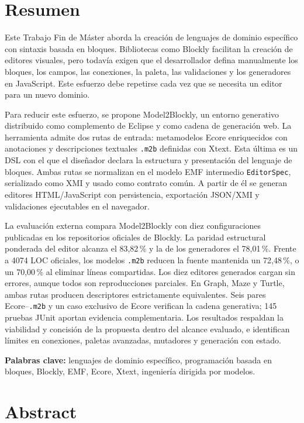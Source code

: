 \chapter*{Resumen}

Este Trabajo Fin de Máster aborda la creación de lenguajes de dominio
específico con sintaxis basada en bloques. Bibliotecas como Blockly facilitan la
creación de editores visuales, pero todavía exigen que el desarrollador defina
manualmente los bloques, los campos, las conexiones, la paleta, las
validaciones y los generadores en JavaScript. Este esfuerzo debe repetirse cada
vez que se necesita un editor para un nuevo dominio.

Para reducir este esfuerzo, se propone Model2Blockly, un entorno generativo
distribuido como complemento de Eclipse y como cadena de generación web. La
herramienta admite dos rutas de entrada: metamodelos Ecore enriquecidos con
anotaciones y descripciones textuales \texttt{.m2b} definidas con Xtext. Esta
última es un DSL con el que el diseñador declara la estructura y presentación
del lenguaje de bloques. Ambas rutas se normalizan en el modelo EMF intermedio
\texttt{EditorSpec}, serializado como XMI y usado como contrato común. A partir
de él se generan editores HTML/JavaScript con persistencia, exportación JSON/XMI
y validaciones ejecutables en el navegador.

La evaluación externa compara Model2Blockly con diez configuraciones publicadas
en los repositorios oficiales de Blockly. La paridad estructural ponderada del
editor alcanza el 83,82\,\% y la de los generadores el 78,01\,\%. Frente a 4074
LOC oficiales, los modelos \texttt{.m2b} reducen la fuente mantenida un
72,48\,\%, o un 70,00\,\% al eliminar líneas compartidas. Los diez editores
generados cargan sin errores, aunque todos son reproducciones parciales. En
Graph, Maze y Turtle, ambas rutas producen descriptores estrictamente
equivalentes. Seis pares Ecore--\texttt{.m2b} y un caso exclusivo de Ecore
verifican la cadena generativa; 145 pruebas JUnit aportan evidencia
complementaria. Los
resultados respaldan la viabilidad y concisión de la propuesta dentro del
alcance evaluado, e identifican límites en conexiones, paletas avanzadas,
mutadores y generación con estado.

\noindent\textbf{Palabras clave:} lenguajes de dominio específico, programación
basada en bloques, Blockly, EMF, Ecore, Xtext, ingeniería dirigida por modelos.

\chapter*{Abstract}

